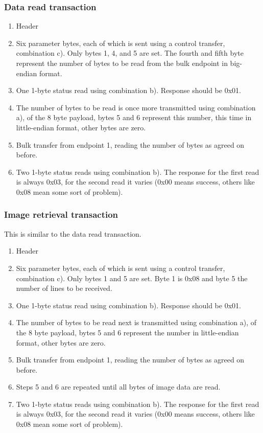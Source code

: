 \documentclass{article}
\begin{document}
\subsubsection{Data read transaction}

\begin{enumerate}
  \item Header
  \item Six parameter bytes, each of which is sent using a control transfer, combination c).
        Only bytes 1, 4, and 5 are set.
        The fourth and fifth byte represent the number of bytes to be read from the bulk endpoint
        in big-endian format.
  \item One 1-byte status read using combination b). Response should be 0x01.
  \item The number of bytes to be read is once more transmitted using combination a), of the 8
        byte payload, bytes 5 and 6 represent this number, this time in little-endian format, other
        bytes are zero.
  \item Bulk transfer from endpoint 1, reading the number of bytes as agreed on before.
  \item Two 1-byte status reads using combination b). The response for the first read is always 0x03,
        for the second read it varies (0x00 means success, others like 0x08 mean some sort of problem).
\end{enumerate}

\subsubsection{Image retrieval transaction}

This is similar to the data read transaction.

\begin{enumerate}
  \item Header
  \item Six parameter bytes, each of which is sent using a control transfer, combination c).
        Only bytes 1 and 5 are set.
        Byte 1 is 0x08 and byte 5 the number of lines to be received.
  \item One 1-byte status read using combination b). Response should be 0x01.
  
  \item The number of bytes to be read next is transmitted using combination a), of the 8
        byte payload, bytes 5 and 6 represent the number in little-endian format, other
        bytes are zero.
  \item Bulk transfer from endpoint 1, reading the number of bytes as agreed on before.
  
  \item Steps 5 and 6 are repeated until all bytes of image data are read.
  
  \item Two 1-byte status reads using combination b). The response for the first read is always 0x03,
        for the second read it varies (0x00 means success, others like 0x08 mean some sort of problem).
\end{enumerate}
\end{document}
